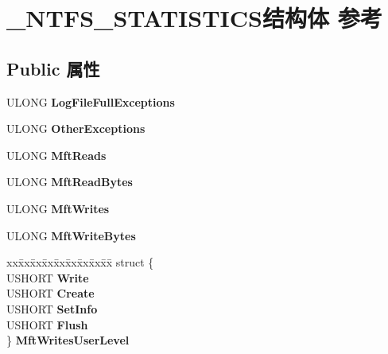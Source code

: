 \hypertarget{struct___n_t_f_s___s_t_a_t_i_s_t_i_c_s}{}\section{\+\_\+\+N\+T\+F\+S\+\_\+\+S\+T\+A\+T\+I\+S\+T\+I\+C\+S结构体 参考}
\label{struct___n_t_f_s___s_t_a_t_i_s_t_i_c_s}
\subsection*{Public 属性}
\begin{DoxyCompactItemize}
\item 
\mbox{\label{struct___n_t_f_s___s_t_a_t_i_s_t_i_c_s_ac60ebe0cdb6c41a34d5e2ab76769f216}} 
U\+L\+O\+NG {\bfseries Log\+File\+Full\+Exceptions}
\item 
\mbox{\label{struct___n_t_f_s___s_t_a_t_i_s_t_i_c_s_abb83eee5208598999de1e11adcddf6f8}} 
U\+L\+O\+NG {\bfseries Other\+Exceptions}
\item 
\mbox{\label{struct___n_t_f_s___s_t_a_t_i_s_t_i_c_s_a040152172a88e84f74c8904b2f07d546}} 
U\+L\+O\+NG {\bfseries Mft\+Reads}
\item 
\mbox{\label{struct___n_t_f_s___s_t_a_t_i_s_t_i_c_s_ad2565c970f981e2c53cf0647ba05d36e}} 
U\+L\+O\+NG {\bfseries Mft\+Read\+Bytes}
\item 
\mbox{\label{struct___n_t_f_s___s_t_a_t_i_s_t_i_c_s_acbe39e2d7fd7f4468cfde3523b48e4a1}} 
U\+L\+O\+NG {\bfseries Mft\+Writes}
\item 
\mbox{\label{struct___n_t_f_s___s_t_a_t_i_s_t_i_c_s_ad0df5a6bae4f6962ed0d3e06e03339cc}} 
U\+L\+O\+NG {\bfseries Mft\+Write\+Bytes}
\item 
\mbox{\label{struct___n_t_f_s___s_t_a_t_i_s_t_i_c_s_a3a6bb65817bbace651627d7bc085f598}} 
\begin{tabbing}
xx\=xx\=xx\=xx\=xx\=xx\=xx\=xx\=xx\=\kill
struct \{\\
\>USHORT {\bfseries Write}\\
\>USHORT {\bfseries Create}\\
\>USHORT {\bfseries SetInfo}\\
\>USHORT {\bfseries Flush}\\
\} {\bfseries MftWritesUserLevel}\\


\end{tabbing}
\end{DoxyCompactItemize}
